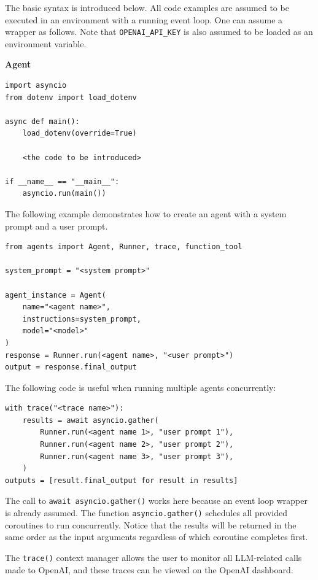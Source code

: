 The basic syntax is introduced below. All code examples are assumed to be executed in an environment with a running event loop. One can assume a wrapper as follows. Note that \verb|OPENAI_API_KEY| is also assumed to be loaded as an environment variable.

\vspace{0.1in}
\noindent \textbf{Agent}
\vspace{0.1in}

\begin{lstlisting}
import asyncio
from dotenv import load_dotenv

async def main():
    load_dotenv(override=True)
    
    <the code to be introduced>

if __name__ == "__main__":
    asyncio.run(main())
\end{lstlisting}

The following example demonstrates how to create an agent with a system prompt and a user prompt.

\begin{lstlisting}
from agents import Agent, Runner, trace, function_tool

system_prompt = "<system prompt>"

agent_instance = Agent(
    name="<agent name>",
    instructions=system_prompt,
    model="<model>"
)
response = Runner.run(<agent name>, "<user prompt>")
output = response.final_output
\end{lstlisting}

The following code is useful when running multiple agents concurrently:
\begin{lstlisting}
with trace("<trace name>"):
    results = await asyncio.gather(
        Runner.run(<agent name 1>, "user prompt 1"),
        Runner.run(<agent name 2>, "user prompt 2"),
        Runner.run(<agent name 3>, "user prompt 3"),
    )
outputs = [result.final_output for result in results]
\end{lstlisting}

The call to \texttt{await asyncio.gather()} works here because an event loop wrapper is already assumed. The function \texttt{asyncio.gather()} schedules all provided coroutines to run concurrently. Notice that the results will be returned in the same order as the input arguments regardless of which coroutine completes first. 

The \verb|trace()| context manager allows the user to monitor all LLM-related calls made to OpenAI, and these traces can be viewed on the OpenAI dashboard.

